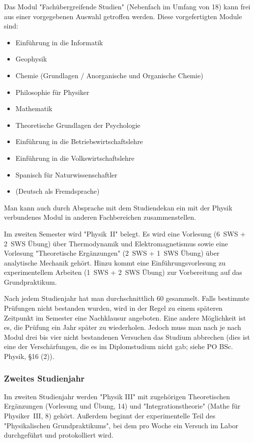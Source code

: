 \begin{multicols}{2}
Das Modul "Fachübergreifende Studien" (Nebenfach im Umfang von \SI{18}{\LP}) kann frei aus einer vorgegebenen Auswahl getroffen werden.
Diese vorgefertigten Module sind:
\begin{itemize}[parsep=0.7ex]
	\item Einführung in die Informatik
	\item Geophysik
	\item Chemie (Grundlagen / Anorganische und Organische Chemie)
	\item Philosophie für Physiker
	\item Mathematik
	\item Theoretische Grundlagen der Psychologie
	\item Einführung in die Betriebswirtschaftslehre
	\item Einführung in die Volkswirtschaftslehre
	\item Spanisch für Naturwissenschaftler
	\item (Deutsch als Fremdsprache)
\end{itemize}
Man kann auch durch Absprache mit dem Studiendekan ein mit der Physik verbundenes Modul in anderen Fachbereichen zusammenstellen.

Im zweiten Semester wird "Physik~II" belegt.
Es wird eine Vorlesung (6~SWS + 2~SWS Übung) über Thermodynamik und Elektromagnetismus sowie eine Vorlesung "Theoretische Ergänzungen" (2~SWS + 1~SWS Übung) über analytische Mechanik gehört. Hinzu kommt eine Einführungsvorlesung zu experimentellem Arbeiten (1~SWS + 2~SWS Übung) zur Vorbereitung auf das Grundpraktikum.

Nach jedem Studienjahr hat man durchschnittlich \SI{60}{\LP} gesammelt.
Falls bestimmte Prüfungen nicht bestanden wurden, wird in der Regel zu einem späteren Zeitpunkt im Semester eine Nachklausur angeboten.
Eine andere Möglichkeit ist es, die Prüfung ein Jahr später zu wiederholen.
Jedoch muss man nach je nach Modul drei bis vier nicht bestandenen Versuchen das Studium abbrechen (dies ist eine der Verschärfungen, die es im Diplomstudium nicht gab; siehe PO BSc. Physik, §16 (2)).
\subsubsection[Zweites Studienjahr]{\hspace{-1.5em}Zweites Studienjahr}
\iffalse
\setlength{\intextsep}{1mm}
\begin{wrapfigure}[9]{r}[5mm]{0cm}
	\raisebox{0pt}[\dimexpr\height - 6mm\relax]{%
		\fibelimgtext[above right]{
			\texttt{[image: res/xkcd/755\_interdisciplinary.png]}%
		}{\url{https://xkcd.com/755}}%
	}
\end{wrapfigure}
\fi
Im zweiten Studienjahr werden "Physik III" mit zugehörigen Theoretischen Ergänzungen (Vorlesung und Übung, \SI{14}{\LP}) und "Integrationstheorie" (Mathe für Physiker~III, \SI{8}{\LP}) gehört.
Außerdem beginnt der experimentelle Teil des "Physikalischen Grundpraktikums", bei dem pro Woche ein Versuch im Labor durchgeführt und protokolliert wird.


\end{multicols}
